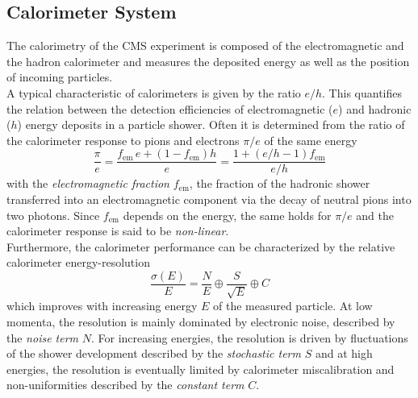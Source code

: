 \subsection{Calorimeter System}
\label{subsec:calorimeters}
The calorimetry of the CMS experiment is composed of the electromagnetic and the hadron calorimeter and measures the deposited energy as well as the position of incoming particles. \\
A typical characteristic of calorimeters is given by the ratio $e/h$. This quantifies the relation between the detection efficiencies of electromagnetic ($e$) and hadronic ($h$) energy deposits in a particle shower. Often it is determined from the ratio of the calorimeter response to pions and electrons $\pi/e$ of the same energy
\begin{equation}
\frac{\pi}{e} = \frac{f_\mathrm{em}\, e + (1 - f_\mathrm{em}) h}{e} = \frac{1+(e/h - 1) f_\mathrm{em}}{e/h}
\end{equation}
with the \textit{electromagnetic fraction} $f_\mathrm{em}$, \ie the fraction of the hadronic shower transferred into an electromagnetic component via the decay of neutral pions into two photons. Since $f_\mathrm{em}$ depends on the energy, the same holds for $\pi/e$ and the calorimeter response is said to be \textit{non-linear}. \\
Furthermore, the calorimeter performance can be characterized by the relative calorimeter energy-resolution
\begin{equation}
\frac{\sigma(E)}{E}= \frac{N}{E} \oplus \frac{S}{\sqrt{E}} \oplus C 
\end{equation}
which improves with increasing energy $E$ of the measured particle. At low momenta, the resolution is mainly dominated by electronic noise, described by the \textit{noise term} $N$. For increasing energies, the resolution is driven by fluctuations of the shower development described by the \textit{stochastic term} $S$ and at high energies, the resolution is eventually limited by calorimeter miscalibration and non-uniformities described by the \textit{constant term} $C$.

